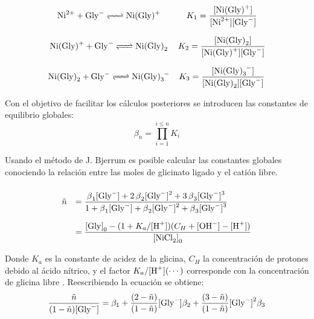 \documentclass[fleqn,10pt]{SelfArx} %
\begin{document}
	\scriptsize
	\begin{equation}\label{eq: constants}
	\def\arraystretch{3}
		\begin{array}{cc}
			\ce{Ni^{2+} + Gly- <=> Ni(Gly)+} & K_1 = \dfrac{\ce{[Ni(Gly)+]}}{\ce{[Ni^{2+}][Gly^-]}}\\
			\ce{Ni(Gly)+ + Gly- <=> Ni(Gly)_2} & K_2 = \dfrac{\ce{[Ni(Gly)_2]}}{\ce{[Ni(Gly)+][Gly^-]}}\\
			\ce{Ni(Gly)_2 + Gly- <=> Ni(Gly)_3-} & K_3 = 		\dfrac{\ce{[Ni(Gly)_3^-]}}{\ce{[Ni(Gly)_2][Gly^-]}}
		\end{array}
	\end{equation}
	\normalsize
	
	Con el objetivo de facilitar los c\'alculos posteriores se introducen las constantes de equilibrio globales:
	\begin{equation}
		\beta_n = \prod\limits_{i=1}^{i \leq n} K_i
	\end{equation}
	
	Usando el m\'etodo de J. Bjerrum es posible calcular las constantes globales conociendo la relaci\'on entre las moles de glicinato ligado y el cati\'on libre.
	\small  
	\begin{equation}\label{eq: fit}
	\def\arraystretch{3}
		\begin{array}{rl}
			\tilde{n} & = \dfrac{\ce{\beta_1[Gly^-] + 2\beta_2[Gly^-]^2 + 3\beta_3[Gly^-]^3}}{\ce{1 + \beta_1[Gly^-] + \beta_2[Gly^-]^2 + \beta_3[Gly^-]^3}} \\
			& = \dfrac{\ce{[Gly]}_0 - (1+K_a/\ce{[H+]})(C_H + \ce{[OH^-] - [H+]})}{\ce{[NiCl2]}_0}
		\end{array}
	\end{equation}
	\normalsize
	
	Donde $K_a$ es la constante de acidez de la glicina, $C_H$ la concentraci\'on de protones debido al \'acido n\'itrico, y el factor $K_a/\ce{[H+]}(\cdots)$ corresponde con la concentraci\'on de glicina libre \ce{[Gly^-]}. Reescribiendo la ecuaci\'on se obtiene:
	\footnotesize
	\begin{equation}\label{eq: Rossetti}
	\dfrac{\tilde{n}}{(1-\tilde{n})\ce{[Gly^-]}} = \beta_1 + \dfrac{(2-\tilde{n})}{(1-\tilde{n})}\ce{[Gly^-]}\beta_2 + \dfrac{(3-\tilde{n})}{(1-\tilde{n})}\ce{[Gly^-]}^2\beta_3
	\end{equation}
	\normalsize
	
\end{document}
